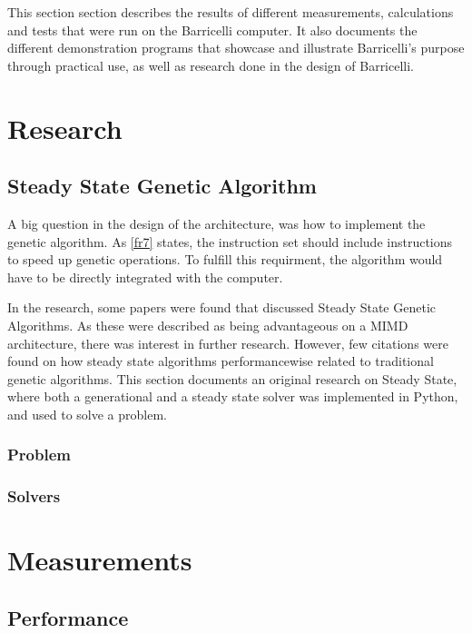 This section section describes the results of different measurements, calculations and tests that were run on the Barricelli computer.
It also documents the different demonstration programs that showcase and illustrate Barricelli's purpose through practical use, as well as research done in the design of Barricelli.

\section{Research}

\subsection{Steady State Genetic Algorithm}
A big question in the design of the architecture, was how to implement the genetic algorithm.
As \vref{fr7} states, the instruction set should include instructions to speed up genetic operations.
To fulfill this requirment, the algorithm would have to be directly integrated with the computer.

In the research, some papers were found that discussed Steady State Genetic Algorithms.\cite{vlsi-ga}
As these were described as being advantageous on a MIMD architecture, there was interest in further research.
However, few citations were found on how steady state algorithms performancewise related to traditional genetic algorithms.
This section documents an original research on Steady State, where both a generational and a steady state solver was implemented in Python, and used to solve a problem.

\subsubsection{Problem}
 \label{problems-ga}

\subsubsection{Solvers}
 \label{solvers-ga}

\section{Measurements}

\subsection{Performance}

